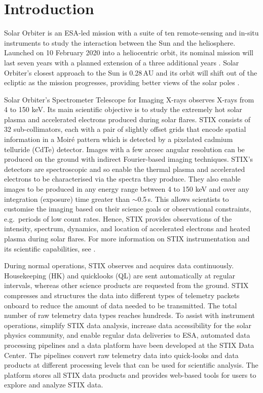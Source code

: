 \documentclass[referee]{aa} %
\begin{document}
\section{Introduction}
Solar Orbiter is an ESA-led mission with a suite of ten remote-sensing and in-situ instruments to study the interaction between the Sun and the heliosphere. Launched on 10 February 2020 into a heliocentric orbit, its nominal mission will last seven years with a planned extension of a three additional years \citep{Mueller2020}.
Solar Orbiter's closest approach to the Sun is 0.28\,AU and its orbit will shift out of the ecliptic as the mission progresses, providing better views of the solar poles \citep{SolarOrbiter2020}.

Solar Orbiter's Spectrometer Telescope for Imaging X-rays \citep[STIX;][]{stix2020} observes X-rays from 4 to 150 keV.  Its main scientific objective is to study the extremely hot solar plasma and accelerated electrons produced during solar flares.
STIX consists of 32 sub-collimators, each with a pair of slightly offset grids that encode spatial information in a Moiré pattern which is detected by a pixelated cadmium telluride (CdTe) detector. Images with a few arcsec angular resolution can be produced on the ground with indirect Fourier-based imaging techniques.  STIX's detectors are spectroscopic and so enable the thermal plasma and accelerated electrons to be characterised via the spectra they produce.
They also enable images to be produced in any energy range between 4 to 150 keV and over any integration (exposure) time greater than $\sim$0.5\,s.
This allows scientists to customise the imaging based on their science goals or observational constraints, e.g.\ periods of low count rates. Hence, STIX provides observations of the intensity, spectrum, dynamics, and location of accelerated electrons and heated plasma during solar flares. For more information on STIX instrumentation and its scientific capabilities, see \citet{stix2020}.




During normal operations, STIX observes and acquires data continuously. Housekeeping (HK) and quicklooks (QL) are sent automatically at regular intervals, whereas other science products are requested from the ground. STIX compresses and structures the data into different types of telemetry packets onboard to reduce the amount of data needed to be transmitted. 
The total number of raw telemetry data types reaches hundreds.
To assist with instrument operations, simplify STIX data analysis, increase data accessibility for the solar physics community, and enable regular data deliveries to ESA, automated data processing pipelines and a data platform have been developed at the STIX Data Center.
The pipelines convert raw telemetry data into quick-looks and data products at different processing levels that can be used for scientific analysis. The platform stores all STIX data products and provides web-based tools for users to explore and analyze STIX data.
\end{document}
